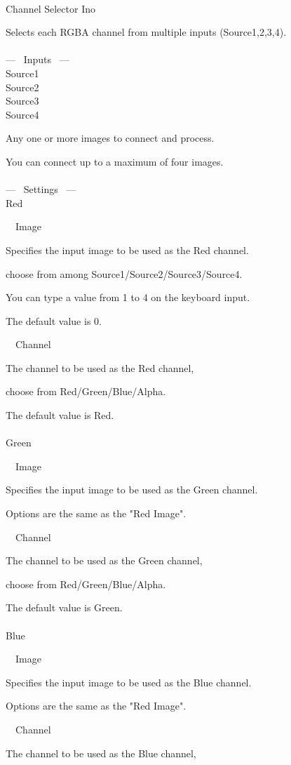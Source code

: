 \documentclass[a4paper,12pt]{article}
\begin{document}
\thispagestyle{empty}

\Large
\noindent \\
Channel Selector Ino\medskip
\par
\normalsize
Selects each RGBA channel from multiple inputs (Source1,2,3,4).\\
\\
--- \ Inputs \ ---\\
Source1\\
Source2\\
Source3\\
Source4\par
Any one or more images to connect and process.\par
You can connect up to a maximum of four images.\\
\\
--- \ Settings \ ---\\
Red\par
\noindent \ \, Image\par
Specifies the input image to be used as the Red channel.\par
choose from among Source1/Source2/Source3/Source4.\par
You can type a value from 1 to 4 on the keyboard input.\par
The default value is 0.\\
\par
\noindent \ \, Channel\par
The channel to be used as the Red channel,\par
choose from Red/Green/Blue/Alpha.\par
The default value is Red.\\
\\
Green\par
\noindent \ \, Image\par
Specifies the input image to be used as the Green channel.\par
Options are the same as the "Red Image".\\
\par
\noindent \ \, Channel\par
The channel to be used as the Green channel,\par
choose from Red/Green/Blue/Alpha.\par
The default value is Green.\\
\\
Blue\par
\noindent \ \, Image\par
Specifies the input image to be used as the Blue channel.\par
Options are the same as the "Red Image".\\
\par
\noindent \ \, Channel\par
The channel to be used as the Blue channel,
\end{document}
